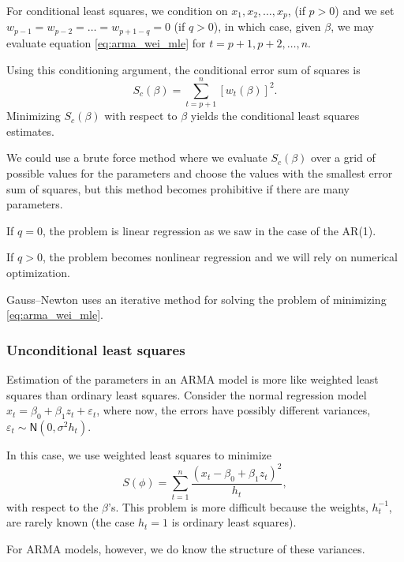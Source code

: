\documentclass[
paper=128mm:96mm, %
fontsize=9.5pt, %
pagesize, %
parskip=half-, %
]{scrartcl} %
\theoremstyle{mythmstyle} %
\begin{document}
For conditional least squares, we condition on $x_1,x_2,\dots,x_p$, (if $p > 0$) and we set $w_{p-1}=w_{p-2}=\dots=w_{p+1-q}=0$ (if $q>0$), in which case, given $\beta$, we may evaluate equation \eqref{eq:arma_wei_mle} for $t=p+1,p+2,\dots,n$. 
\clearpage

Using this conditioning argument, the conditional error sum of squares is
%
\begin{equation}
\label{eq:arma_wei_mle2}
S_c\left(\beta\right)=\sum_{t=p+1}^n\left[w_t\left(\beta\right)\right]^2.
\end{equation}
%
Minimizing $S_c\left(\beta\right)$ with respect to $\beta$ yields the conditional least squares estimates. 

We could use a brute force method where we evaluate $S_c\left(\beta\right)$ over a grid of possible values for the parameters and choose the values with the smallest error sum of squares, but this method becomes prohibitive if there are many parameters.

If $q=0$, the problem is linear regression as we saw in the case of the AR(1). 

If $q > 0$, the problem becomes nonlinear regression and we will rely on numerical optimization. 

Gauss--Newton uses an iterative method for solving the problem of minimizing \eqref{eq:arma_wei_mle}. 
\clearpage





\subsubsection{Unconditional least squares}

Estimation of the parameters in an ARMA model is more like weighted least squares than ordinary least squares. Consider the normal regression model $x_t=\beta_0+\beta_1 z_t+\varepsilon_t$, where now, the errors have possibly different variances, $\varepsilon_t\sim\mathsf{N}(0,\sigma^2h_t)$.

In this case, we use weighted least squares to minimize
%
\begin{equation}
S\left(\phi\right)=\sum_{t=1}^n\frac{\left(x_t-\beta_0 + \beta_1 z_{t}\right)^2}{h_t},\nonumber
\end{equation}
%
with respect to the $\beta$'s. This problem is more difficult because the weights, $h_t^{-1}$, are rarely known (the case $h_t=1$ is ordinary least squares). 

For ARMA models, however, we do know the structure of these variances.
\clearpage
\end{document}
